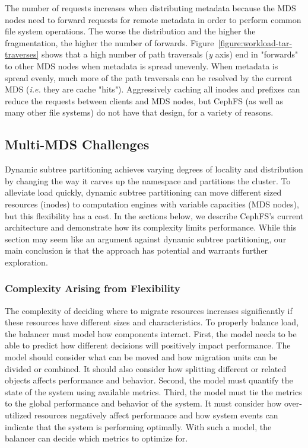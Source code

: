 The number of requests increases when distributing metadata because the MDS nodes need to forward requests for remote metadata in order to perform common file system operations. The worse the distribution and the higher the fragmentation, the higher the number of forwards. Figure~\ref{figure:workload-tar-traverses} shows that a high number of path traversals ({\it y} axis) end in "forwards" to other MDS nodes when metadata is spread unevenly. When metadata is spread evenly, much more of the path traversals can be resolved by the current MDS ({\it i.e.} they are cache "hits"). Aggressively caching all inodes and prefixes can reduce the requests between clients and MDS nodes, but CephFS (as well as many other file systems) do not have that design, for a variety of reasons.

\subsection{Multi-MDS Challenges}					    %
\label{multi-mds_challenges}						    %
Dynamic subtree partitioning achieves varying degrees of locality and distribution by changing the way it carves up the namespace and partitions the cluster. To alleviate load quickly, dynamic subtree partitioning can move different sized resources (inodes) to computation engines with variable capacities (MDS nodes), but this flexibility has a cost. In the sections below, we describe CephFS's current architecture and demonstrate how its complexity limits performance. While this section may seem like an argument against dynamic subtree partitioning, our main conclusion is that the approach has potential and warrants further exploration. 

\subsubsection{Complexity Arising from Flexibility}
\label{complexity-arising-from-flexibility}

The complexity of deciding where to migrate resources increases significantly if these resources have different sizes and characteristics. To properly balance load, the balancer must model how components interact. First, the model needs to be able to predict how different decisions will positively impact performance. The model should consider what can be moved and how migration units can be divided or combined. It should also  consider how splitting different or related objects affects performance and behavior. Second, the model must quantify the state of the system using available metrics. Third, the model must tie the metrics to the global performance and behavior of the system. It must consider how over-utilized resources negatively affect performance and how system events can indicate that the system is performing optimally. With such a model, the balancer can decide which metrics to optimize for.

